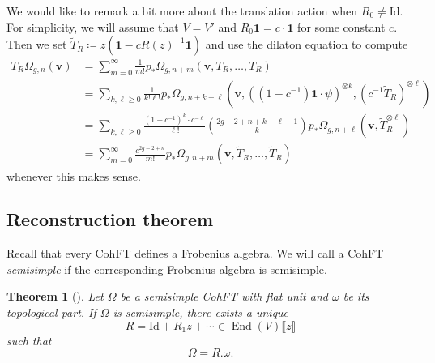 \documentclass[10pt,oldfontcommands,oneside]{memoir}
\newtheorem{thm}{Theorem}[section]
\theoremstyle{definition}
\theoremstyle{remark}
\theoremstyle{plain}
\theoremstyle{definition}
\theoremstyle{remark}
\newcommand{\mbf}[1]{\mathbf{#1}}
\newcommand{\bv}{\mbf{v}}
\newcommand{\mr}[1]{\mathrm{#1}}
\newcommand{\1}{\mathbf{1}}
\newcommand{\2}{\mathbf{2}}
\newcommand{\3}{\mathbf{3}}
\newcommand{\ps}[1]{\llbracket #1 \rrbracket}
\DeclareMathOperator{\End}{End}
\begin{document}
We would like to remark a bit more about the translation action when $R_0 \neq \mr{Id}$. For simplicity, we will assume that $V = V'$ and $R_0 \1 = c \cdot \1$ for some constant $c$. Then we set $\tilde{T}_R \coloneqq z( \1 - c R(z)^{-1} \1)$ and use the dilaton equation to compute
\begin{align*}
    T_R \Omega_{g,n}(\bv) &= \sum_{m=0}^{\infty} \frac{1}{m!} p_*\Omega_{g,n+m}(\bv, T_R, \ldots, T_R) \\
    &= \sum_{k,\ell \geq 0} \frac{1}{k!\ell!} p_* \Omega_{g,n+k+\ell}(\bv, ( (1-c^{-1})\1 \cdot \psi )^{\otimes k}, ( c^{-1} \tilde{T}_R )^{\otimes \ell}) \\
    &= \sum_{k,\ell \geq 0} \frac{(1-c^{-1})^k \cdot c^{-\ell}}{\ell!} \binom{2g-2+n+k+\ell-1}{k} p_* \Omega_{g,n+\ell}(\bv, \tilde{T}_R^{\otimes \ell}) \\
    &= \sum_{m=0}^{\infty} \frac{c^{2g-2+n}}{m!} p_* \Omega_{g,n+m}(\bv, \tilde{T}_R, \ldots, \tilde{T}_R)
\end{align*}
whenever this makes sense.


\subsection{Reconstruction theorem}%
\label{sub:Reconstruction theorem}

Recall that every CohFT defines a Frobenius algebra. We will call a CohFT \textit{semisimple} if the corresponding Frobenius algebra is semisimple.

\begin{thm}[{\cite{2dsscohft}}]
    Let $\Omega$ be a semisimple CohFT with flat unit and $\omega$ be its topological part. If $\Omega$ is semisimple, there exists a unique 
    \[ R = \mr{Id} + R_1 z + \cdots \in \End(V)\ps{z} \]
    such that
    \[ \Omega = R.\omega. \]
\end{thm}
\end{document}
